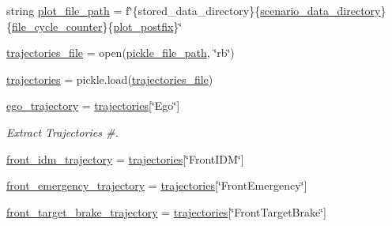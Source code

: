 \begin{DoxyCompactItemize}
\item 
string \hyperlink{namespaceimplementation_1_1trajectory__plotter_ab7f05b6b273366f3532e78b97de5069e}{plot\+\_\+file\+\_\+path} = f\char`\"{}\{stored\+\_\+data\+\_\+directory\}\{\hyperlink{namespaceimplementation_1_1trajectory__plotter_a8cd16ae40d4a9e36d8aa403f58180906}{scenario\+\_\+data\+\_\+directory}\}\{\hyperlink{namespaceimplementation_1_1trajectory__plotter_a230271bc03fa2b0dc367f3c14e161d39}{file\+\_\+cycle\+\_\+counter}\}\{\hyperlink{namespaceimplementation_1_1trajectory__plotter_a79541972f50d0a8493d777e6eff64e8f}{plot\+\_\+postfix}\}\char`\"{}
\item 
\hyperlink{namespaceimplementation_1_1trajectory__plotter_a59aeffcf1f947b61dfc8fe36cc9b0500}{trajectories\+\_\+file} = open(\hyperlink{namespaceimplementation_1_1trajectory__plotter_a04d83f0f36286c497bf007c9308a4b95}{pickle\+\_\+file\+\_\+path}, \char`\"{}rb\char`\"{})
\item 
\hyperlink{namespaceimplementation_1_1trajectory__plotter_a67e6bdba78400aff3229d099a95259fb}{trajectories} = pickle.\+load(\hyperlink{namespaceimplementation_1_1trajectory__plotter_a59aeffcf1f947b61dfc8fe36cc9b0500}{trajectories\+\_\+file})
\item 
\hyperlink{namespaceimplementation_1_1trajectory__plotter_a67f2155d9cf9a5d23184e9a8331fa9c5}{ego\+\_\+trajectory} = \hyperlink{namespaceimplementation_1_1trajectory__plotter_a67e6bdba78400aff3229d099a95259fb}{trajectories}\mbox{[}\char`\"{}Ego\char`\"{}\mbox{]}
\begin{DoxyCompactList}\small\item\em Extract Trajectories \#. \end{DoxyCompactList}\item 
\hyperlink{namespaceimplementation_1_1trajectory__plotter_a4c22c7f433a5039d636903ed5f4e1108}{front\+\_\+idm\+\_\+trajectory} = \hyperlink{namespaceimplementation_1_1trajectory__plotter_a67e6bdba78400aff3229d099a95259fb}{trajectories}\mbox{[}\char`\"{}Front\+I\+DM\char`\"{}\mbox{]}
\item 
\hyperlink{namespaceimplementation_1_1trajectory__plotter_a846371d252b7c5855d1ff6fb0e40ba5f}{front\+\_\+emergency\+\_\+trajectory} = \hyperlink{namespaceimplementation_1_1trajectory__plotter_a67e6bdba78400aff3229d099a95259fb}{trajectories}\mbox{[}\char`\"{}Front\+Emergency\char`\"{}\mbox{]}
\item 
\hyperlink{namespaceimplementation_1_1trajectory__plotter_af6991a76275b979eba7ce26234f998ad}{front\+\_\+target\+\_\+brake\+\_\+trajectory} = \hyperlink{namespaceimplementation_1_1trajectory__plotter_a67e6bdba78400aff3229d099a95259fb}{trajectories}\mbox{[}\char`\"{}Front\+Target\+Brake\char`\"{}\mbox{]}
\end{DoxyCompactItemize}


